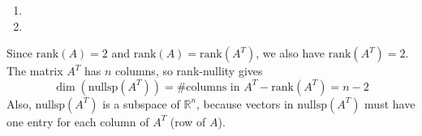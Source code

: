 \documentclass[11pt]{article}
\begin{document}
\begin{prob}
\begin{subprob}
\begin{enumerate}[label=(\roman*)]
    \item {}      
    \item {}      
\end{enumerate}
\begin{solution}
Since $\text{rank}(A)=2$ and $\text{rank}(A) = \text{rank}(A^T)$, we also have $\text{rank}(A^T)=2$. The matrix $A^T$ has $n$ columns, so rank-nullity gives
\[
\dim(\text{nullsp}(A^T)) = \text{\# columns in $A^T$} - \text{rank}(A^T) = n - 2
\]
Also, $\text{nullsp}(A^T)$ is a subspace of $\mathbb{R}^n$, because vectors in $\text{nullsp}(A^T)$ must have one entry for each column of $A^T$ (row of $A$).
\end{solution}
\end{subprob}

\end{prob}

\newpage






        
\end{document}
